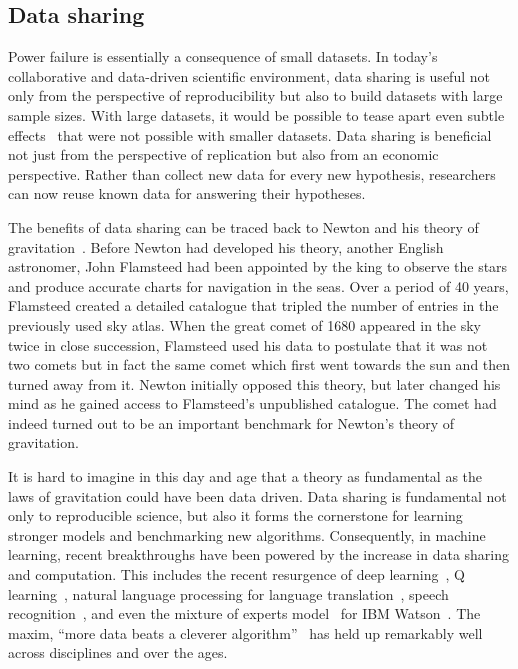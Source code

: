 \subsection{Data sharing}
\label{sec:intro_datasharing}
Power failure is essentially a consequence of small datasets. In today's collaborative and data-driven scientific environment, data sharing is useful not only from the perspective of reproducibility but also to build datasets with large sample sizes. With large datasets, it would be possible to tease apart even subtle effects~\citep{smith2017statistical} that were not possible with smaller datasets. Data sharing is beneficial not just from the perspective of replication but also from an economic perspective. Rather than collect new data for every new hypothesis, researchers can now reuse known data for answering their hypotheses.

The benefits of data sharing can be traced back to Newton and his theory of gravitation~\citep{pointofview2013}. Before Newton had developed his theory, another English astronomer, John Flamsteed had been appointed by the king to observe the stars and produce accurate charts for navigation in the seas. Over a period of 40 years, Flamsteed created a detailed catalogue that tripled the number of entries in the previously used sky atlas. When the great comet of 1680 appeared in the sky twice in close succession, Flamsteed used his data to postulate that it was not two comets but in fact the same comet which first went towards the sun and then turned away from it. Newton initially opposed this theory, but later changed his mind as he gained access to Flamsteed's unpublished catalogue. The comet had indeed turned out to be an important benchmark for Newton's theory of gravitation.

It is hard to imagine in this day and age that a theory as fundamental as the laws of gravitation could have been data driven. Data sharing is fundamental not only to reproducible science, but also it forms the cornerstone for learning stronger models and benchmarking new algorithms. Consequently, in machine learning, recent breakthroughs have been powered by the increase in data sharing and computation. This includes the recent resurgence of deep learning~\citep{deng2009imagenet}, Q learning~\citep{watkins1992q, bellemare2013arcade}, natural language processing for language translation~\citep{halevy2009unreasonable}, speech recognition~\citep{paul1992design}, and even the mixture of experts model~\citep{jacobs1991adaptive} for IBM Watson~\citep{ferrucci2010building}. The maxim, ``more data beats a cleverer algorithm''~\citep{domingos2012few} has held up remarkably well across disciplines and over the ages.

